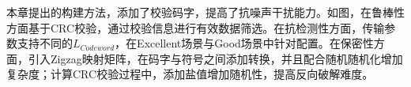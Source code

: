 
本章提出的构建方法，添加了校验码字，提高了抗噪声干扰能力。如图，在鲁棒性方面基于CRC校验，通过校验信息进行有效数据筛选。在抗检测性方面，传输参数支持不同的$L_{Codeword}$，在Excellent场景与Good场景中针对配置。在保密性方面，引入Zigzag映射矩阵，在码字与符号之间添加转换，并且配合随机随机化增加复杂度；计算CRC校验过程中，添加盐值增加随机性，提高反向破解难度。